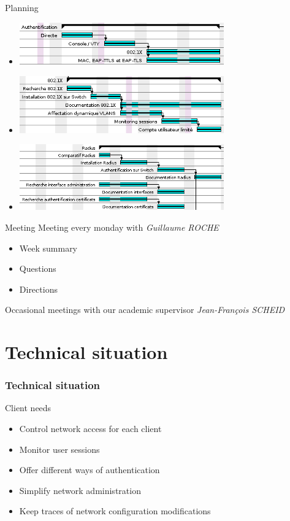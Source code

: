 \documentclass[12pt]{beamer}
\begin{document}
\begin{frame}{Planning}
    \begin{itemize}
	\item \includegraphics[width=250pt]{img/gantt_auth.png}
	\vfill
	\item \includegraphics[width=250pt]{img/gantt_dot1x.png}
	\vfill
	\item \includegraphics[width=250pt]{img/gantt_radius.png}
    \end{itemize}
\end{frame}


\begin{frame}{Meeting}
    Meeting every monday with \emph{Guillaume ROCHE}
    \vfill
    \begin{itemize}
	\item Week summary
	\item Questions 
	\item Directions 
    \end{itemize}
    \vfill
    Occasional meetings with our academic supervisor \emph{Jean-François SCHEID}
\end{frame}


\part{Technical situation}
\frame{\partpage}
\section{Technical situation}

\begin{frame}{Client needs}
    \begin{itemize}[<+->]
	\item Control network access for each client
	\vfill
	\item Monitor user sessions
	\vfill 
	\item Offer different ways of authentication
	\vfill
	\item Simplify network administration
	\vfill
	\item Keep traces of network configuration modifications
    \end{itemize}
\end{frame}
\end{document}
